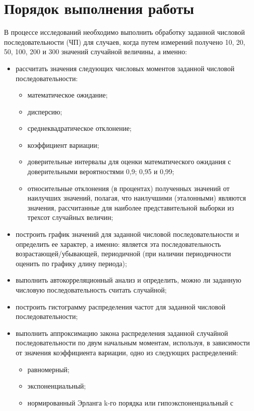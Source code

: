 \documentclass{article}
\begin{document}
\section*{Порядок выполнения работы}
В процессе исследований необходимо выполнить обработку заданной
числовой последовательности (ЧП) для случаев, когда путем измерений получено
10, 20, 50, 100, 200 и 300 значений случайной величины, а именно:
\begin{itemize}
    \item рассчитать значения следующих числовых моментов заданной числовой
    последовательности: 
    \begin{itemize}
        \item математическое ожидание;
        \item дисперсию;
        \item среднеквадратическое отклонение;
        \item коэффициент вариации;
        \item доверительные интервалы для оценки математического ожидания с доверительными вероятностями 0,9; 0,95 и 0,99;
        \item относительные отклонения (в процентах) полученных значений от наилучших значений, полагая, что наилучшими (эталонными) являются значения, рассчитанные для наиболее представительной выборки из трехсот случайных величин;
    \end{itemize}
    \item построить график значений для заданной числовой последовательности и
    определить ее характер, а именно: является эта последовательность
    возрастающей/убывающей, периодичной (при наличии периодичности
    оценить по графику длину периода);
    \item выполнить автокорреляционный анализ и определить, можно ли
    заданную числовую последовательность считать случайной;
    \item построить гистограмму распределения частот для заданной числовой
    последовательности;
    \item  выполнить аппроксимацию закона распределения заданной случайной
    последовательности по двум начальным моментам, используя, в
    зависимости от значения коэффициента вариации, одно из следующих
    распределений:
    \begin{itemize}
        \item равномерный;
        \item экспоненциальный;
        \item нормированный Эрланга k-го порядка или гипоэкспоненциальный с

\end{itemize}
\end{itemize}
\end{document}
